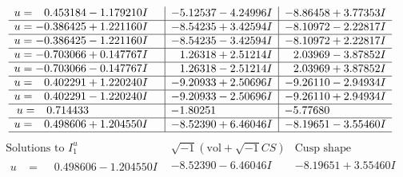 \documentclass[1p]{elsarticle_modified}
\theoremstyle{definition}
\newcommand{\I}{\sqrt{-1}}
\begin{document}
$$\begin{array}{c|c|c}
\begin{aligned}
u &= \phantom{-}0.453184 - 1.179210 I\end{aligned}
 & -5.12537 - 4.24996 I & -8.86458 + 3.77353 I \\ \hline\begin{aligned}
u &= -0.386425 + 1.221160 I\end{aligned}
 & -8.54235 + 3.42594 I & -8.10972 - 2.22817 I \\ \hline\begin{aligned}
u &= -0.386425 - 1.221160 I\end{aligned}
 & -8.54235 - 3.42594 I & -8.10972 + 2.22817 I \\ \hline\begin{aligned}
u &= -0.703066 + 0.147767 I\end{aligned}
 & \phantom{-}1.26318 + 2.51214 I & \phantom{-}2.03969 - 3.87852 I \\ \hline\begin{aligned}
u &= -0.703066 - 0.147767 I\end{aligned}
 & \phantom{-}1.26318 - 2.51214 I & \phantom{-}2.03969 + 3.87852 I \\ \hline\begin{aligned}
u &= \phantom{-}0.402291 + 1.220240 I\end{aligned}
 & -9.20933 + 2.50696 I & -9.26110 - 2.94934 I \\ \hline\begin{aligned}
u &= \phantom{-}0.402291 - 1.220240 I\end{aligned}
 & -9.20933 - 2.50696 I & -9.26110 + 2.94934 I \\ \hline\begin{aligned}
u &= \phantom{-}0.714433\phantom{ +0.000000I}\end{aligned}
 & -1.80251\phantom{ +0.000000I} & -5.77680\phantom{ +0.000000I} \\ \hline\begin{aligned}
u &= \phantom{-}0.498606 + 1.204550 I\end{aligned}
 & -8.52390 + 6.46046 I & -8.19651 - 3.55460 I\\
 \hline 
 \end{array}$$\newpage$$\begin{array}{c|c|c}  
\text{Solutions to }I^u_{1}& \I (\text{vol} + \sqrt{-1}CS) & \text{Cusp shape}\\
 \hline 
\begin{aligned}
u &= \phantom{-}0.498606 - 1.204550 I\end{aligned}
 & -8.52390 - 6.46046 I & -8.19651 + 3.55460 I \\ \hline\begin{aligned}

\end{aligned}
\end{array}$$
\end{document}
